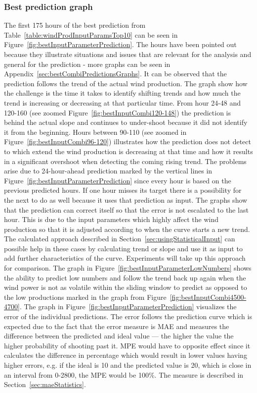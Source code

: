 \subsubsection{Best prediction graph}
\label{sec:bestInputCombiGraph}
The first 175 hours of the best prediction from Table~\ref{table:windProdInputParamsTop10} can be seen in Figure~\ref{fig:bestInputParameterPrediction}. The hours have been pointed out because they illustrate situations and issues that are relevant for the analysis and general for the prediction - more graphs can be seen in Appendix~\ref{sec:bestCombiPredictionsGraphs}. It can be observed that the prediction follows the trend of the actual wind production. The graph show how the challenge is the time it takes to identify shifting trends and how much the trend is increasing or decreasing at that particular time. From hour 24-48 and 120-160 (see zoomed Figure~\ref{fig:bestInputCombi120-148}) the prediction is behind the actual slope and continues to under-shoot because it did not identify it from the beginning. Hours between 90-110 (see zoomed in Figure~\ref{fig:bestInputCombi96-120}) illustrates how the prediction does not detect to which extend the wind production is decreasing at that time and how it results in a significant overshoot when detecting the coming rising trend. The problems arise due to 24-hour-ahead prediction marked by the vertical lines in Figure~\ref{fig:bestInputParameterPrediction} since every hour is based on the previous predicted hours. If one hour misses its target there is a possibility for the next to do as well because it uses that prediction as input. The graphs show that the prediction can correct itself so that the error is not escalated to the last hour. This is due to the input parameters which highly affect the wind production so that it is adjusted according to when the curve starts a new trend. The calculated approach described in Section~\ref{sec:usingStatisticalInput} can possible help in these cases by calculating trend or slope and use it as input to add further characteristics of the curve. Experiments will take up this approach for comparison. The graph in Figure~\ref{fig:bestInputParameterLowNumbers} shows the ability to predict low numbers and follow the trend back up again when the wind power is not as volatile within the sliding window to predict as opposed to the low productions marked in the graph from Figure~\ref{fig:bestInputCombi4500-4700}. The graph in Figure~\ref{fig:bestInputParameterPrediction} visualizes the error of the individual predictions. The error follows the prediction curve which is expected due to the fact that the error measure is MAE and measures the difference between the predicted and ideal value --- the higher the value the higher probability of shooting past it. MPE would have to opposite effect since it calculates the difference in percentage which would result in lower values having higher errors, e.g. if the ideal is 10 and the predicted value is 20, which is close in an interval from 0-2800, the MPE would be 100\%. The measure is described in Section~\ref{sec:maeStatistics}.

